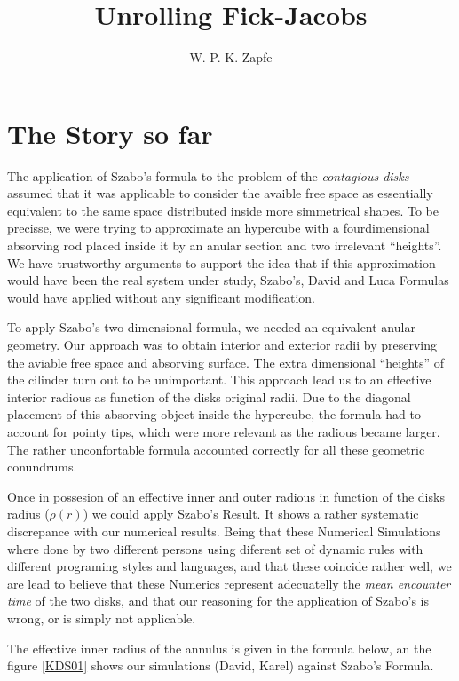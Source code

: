 \documentclass[letterpaperr,12pt]{article}
\title{Unrolling Fick-Jacobs}
\author{W. P. K. Zapfe}
\begin{document}
\maketitle


\section{The Story so far}

The application of Szabo's formula to the problem of
the \emph{contagious disks}  assumed that it was applicable
to consider the avaible free space as essentially equivalent to
the same space distributed inside more simmetrical shapes. 
To be precisse, we were trying to approximate an hypercube with
a fourdimensional absorving rod placed inside it by 
an anular section and two irrelevant ``heights''. We
have trustworthy arguments to support the idea that if this
approximation would have been the real system under study, 
Szabo's, David and Luca Formulas would have applied without
any significant modification. 

To apply Szabo's two dimensional formula, we needed an equivalent
anular geometry. Our approach was to obtain interior and exterior
radii by preserving the aviable free space and absorving surface. 
The extra dimensional ``heights'' of the cilinder turn out to be
unimportant. This approach lead us to an effective interior radious
as function of the disks original radii. Due to the
diagonal placement of this absorving object inside the hypercube,
the formula had to account for pointy tips, which were more
relevant as the radious became larger.  The rather unconfortable
formula accounted correctly for all these geometric conundrums. 

Once in possesion of an effective inner and outer radious in function
of the disks radius ($\rho(r)$) we could apply Szabo's Result. 
It shows a rather systematic discrepance with our numerical results. 
Being that these Numerical Simulations where done by two different
persons using diferent set of dynamic rules with different programing
styles and  languages, and that these coincide rather well, we are
lead to believe that these Numerics represent adecuatelly the 
\emph{mean encounter time} of the two disks, and that our reasoning
for the application of Szabo's is wrong, or is simply not
applicable.

The effective inner radius of the annulus is given in the formula below,
an the figure \ref{KDS01} shows our simulations (David, Karel) 
against Szabo's Formula. 
\end{document}
